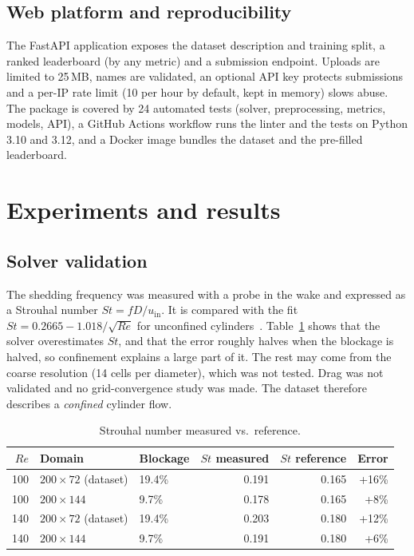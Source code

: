 \documentclass[11pt,a4paper]{article}
\begin{document}
\subsection{Web platform and reproducibility}
The FastAPI application exposes the dataset description and training split, a ranked leaderboard (by any metric) and a submission endpoint. Uploads are limited to 25\,MB, names are validated, an optional API key protects submissions and a per-IP rate limit (10 per hour by default, kept in memory) slows abuse. The package is covered by 24 automated tests (solver, preprocessing, metrics, models, API), a GitHub Actions workflow runs the linter and the tests on Python 3.10 and 3.12, and a Docker image bundles the dataset and the pre-filled leaderboard.

\section{Experiments and results}
\subsection{Solver validation}
The shedding frequency was measured with a probe in the wake and expressed as a Strouhal number $St = fD/u_{\mathrm{in}}$. It is compared with the fit $St = 0.2665 - 1.018/\sqrt{Re}$ for unconfined cylinders~\cite{williamson1998series}. Table~\ref{tab:strouhal} shows that the solver overestimates $St$, and that the error roughly halves when the blockage is halved, so confinement explains a large part of it. The rest may come from the coarse resolution (14 cells per diameter), which was not tested. Drag was not validated and no grid-convergence study was made. The dataset therefore describes a \emph{confined} cylinder flow.

\begin{table}[H]
\centering
\caption{Strouhal number measured vs.\ reference.}\label{tab:strouhal}
\begin{tabular}{rllrrr}
\toprule
$Re$ & Domain & Blockage & $St$ measured & $St$ reference & Error\\
\midrule
100 & $200\times72$ (dataset) & 19.4\% & 0.191 & 0.165 & +16\%\\
100 & $200\times144$ & 9.7\% & 0.178 & 0.165 & +8\%\\
140 & $200\times72$ (dataset) & 19.4\% & 0.203 & 0.180 & +12\%\\
140 & $200\times144$ & 9.7\% & 0.191 & 0.180 & +6\%\\
\bottomrule
\end{tabular}
\end{table}
\end{document}
